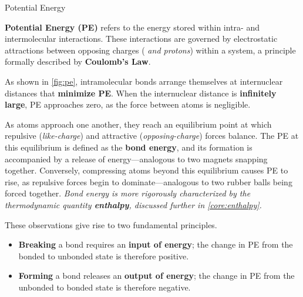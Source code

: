 \documentclass[10pt]{article}
\begin{document}
    \begin{core}[label=core:pe]{Potential Energy}

      \textbf{Potential Energy (PE)} refers to the energy stored within intra- and intermolecular interactions. These interactions are governed by electrostatic attractions between opposing charges (\textit{ and protons}) within a system, a principle formally described by \textbf{Coulomb's Law}.


      As shown in \autoref{fig:pe}, intramolecular bonds arrange themselves at internuclear distances that \textbf{minimize PE}. When the internuclear distance is \textbf{infinitely large}, PE approaches zero, as the force between atoms is negligible.

      As atoms approach one another, they reach an equilibrium point at which repulsive (\textit{like-charge}) and attractive (\textit{opposing-charge}) forces balance. The PE at this equilibrium is defined as the \textbf{bond energy}, and its formation is accompanied by a release of energy---analogous to two magnets snapping together. Conversely, compressing atoms beyond this equilibrium causes PE to rise, as repulsive forces begin to dominate---analogous to two rubber balls being forced together. \textit{Bond energy is more rigorously characterized by the thermodynamic quantity \textbf{enthalpy}, discussed further in \autoref{core:enthalpy}.}

      These observations give rise to two fundamental principles.

      \begin{itemize}

        \item \textbf{Breaking} a bond requires an \textbf{input of energy}; the change in PE from the bonded to unbonded state is therefore positive.

        \item \textbf{Forming} a bond releases an \textbf{output of energy}; the change in PE from the unbonded to bonded state is therefore negative.

      \end{itemize}

    \end{core}
\end{document}
